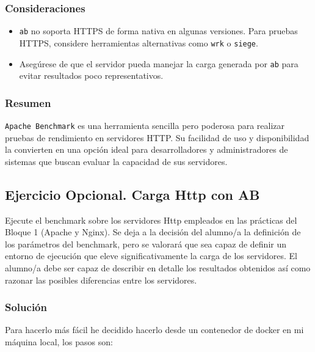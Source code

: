 \subsubsection{Consideraciones}

\begin{itemize}
    \item \texttt{ab} no soporta HTTPS de forma nativa en algunas versiones. Para pruebas HTTPS, considere herramientas alternativas como \texttt{wrk} o \texttt{siege}.
    \item Asegúrese de que el servidor pueda manejar la carga generada por \texttt{ab} para evitar resultados poco representativos.
\end{itemize}

\subsubsection{Resumen}

\texttt{Apache Benchmark} es una herramienta sencilla pero poderosa para realizar pruebas de rendimiento en servidores HTTP. Su facilidad de uso y disponibilidad la convierten en una opción ideal para desarrolladores y administradores de sistemas que buscan evaluar la capacidad de sus servidores.

\subsection{Ejercicio Opcional. Carga Http con AB}

Ejecute el benchmark sobre los servidores Http empleados en las prácticas del Bloque 1 (Apache y Nginx). Se deja a la decisión del alumno/a la definición de los parámetros del benchmark, pero se valorará que sea capaz de definir un entorno de ejecución que eleve significativamente la carga de los servidores. El alumno/a debe ser capaz de describir en detalle los resultados obtenidos así como razonar las posibles diferencias entre los servidores.


\subsubsection{Solución}

Para hacerlo más fácil he decidido hacerlo desde un contenedor de docker en mi máquina local, los pasos son:

